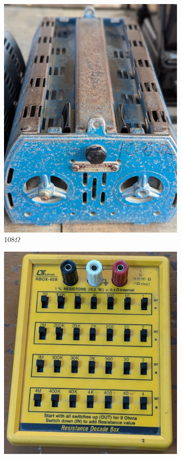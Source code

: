 \documentclass[a4paper,12pt]{article}
\begin{document}
\begin{figure}[H]
		\begin{subfigure}[t]{0.49\textwidth}
			\centering
			\includegraphics[angle=270, width=1\linewidth]{Images/7}
			\caption{108$\Omega$}
		\end{subfigure}
		\hfill
		\begin{subfigure}[t]{0.49\textwidth}
			\centering
			\includegraphics[angle=270, width=0.9\linewidth]{Images/8}

\end{subfigure}
\end{figure}
\end{document}
